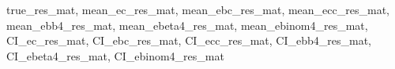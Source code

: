 \documentclass[12pt]{report}
\newcommand{\1}{\mathbf{1}}
\begin{document}
\begin{flushleft}
\begin{algorithm}
\begin{algorithmic}
    \State \Return true\_res\_mat, mean\_ec\_res\_mat, mean\_ebc\_res\_mat, mean\_ecc\_res\_mat, mean\_ebb4\_res\_mat, mean\_ebeta4\_res\_mat, mean\_ebinom4\_res\_mat, CI\_ec\_res\_mat, CI\_ebc\_res\_mat, CI\_ecc\_res\_mat, CI\_ebb4\_res\_mat, CI\_ebeta4\_res\_mat, CI\_ebinom4\_res\_mat
\EndProcedure
\end{algorithmic}
\end{algorithm}






\end{flushleft}
 
\medskip

\printbibliography
\end{document}
